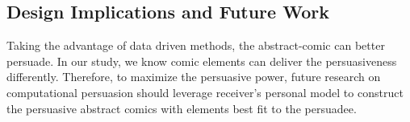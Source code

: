 \subsection{Design Implications and Future Work}
Taking the advantage of data driven methods, the abstract-comic can better persuade. In our study, we know comic elements can deliver the persuasiveness differently. Therefore, to maximize the persuasive power, future research on computational persuasion should leverage receiver's personal model to construct the persuasive abstract comics with elements best fit to the persuadee.
